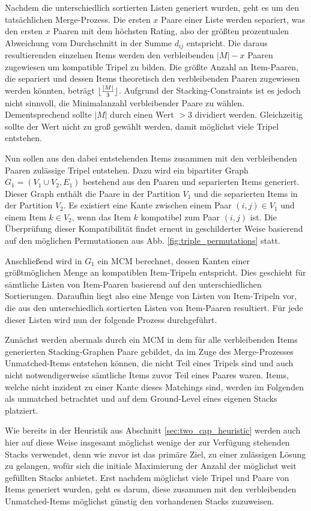 Nachdem die unterschiedlich sortierten Listen generiert wurden, geht es um den tatsächlichen Merge-Prozess.
Die ersten $x$ Paare einer Liste werden separiert, was den ersten $x$ Paaren mit dem höchsten Rating, also der größten
prozentualen Abweichung vom Durchschnitt in der Summe $d_{ij}$ entspricht. Die daraus resultierenden einzelnen Items werden den verbleibenden
$|M| - x$ Paaren zugewiesen um kompatible Tripel zu bilden. Die größte Anzahl an Item-Paaren, die separiert und dessen Items theoretisch den verbleibenden Paaren zugewiesen werden könnten, beträgt $\lfloor\frac{|M|}{3}\rfloor$. Aufgrund der Stacking-Constraints ist es jedoch nicht sinnvoll, die Minimalanzahl verbleibender Paare zu wählen. Dementsprechend sollte $|M|$ durch einen Wert $> 3$ dividiert werden. Gleichzeitig sollte der Wert nicht zu groß gewählt werden, damit möglichst viele Tripel entstehen.

Nun sollen aus den dabei entstehenden Items zusammen mit den verbleibenden Paaren zulässige Tripel entstehen.
Dazu wird ein bipartiter Graph $G_1 = (V_1 \cup V_2, E_1)$ bestehend aus den Paaren und separierten Items generiert.
Dieser Graph enthält die Paare in der Partition $V_1$ und die separierten Items in der Partition $V_2$.
Es existiert eine Kante zwischen einem Paar $(i, j) \in V_1$ und einem Item $k \in V_2$, wenn das Item $k$ kompatibel zum Paar
$(i, j)$ ist. Die Überprüfung dieser Kompatibilität findet erneut in geschilderter Weise basierend auf den möglichen Permutationen
aus Abb. \ref{fig:triple_permutations} statt.

Anschließend wird in $G_1$ ein \textsc{MCM} berechnet, dessen Kanten einer größtmöglichen Menge an kompatiblen Item-Tripeln entspricht.
Dies geschieht für sämtliche Listen von Item-Paaren basierend auf den unterschiedlichen Sortierungen.
Daraufhin liegt also eine Menge von Listen von Item-Tripeln vor, die aus den unterschiedlich sortierten Listen von Item-Paaren resultiert.
Für jede dieser Listen wird nun der folgende Prozess durchgeführt.

Zunächst werden abermals durch ein \textsc{MCM} in dem für alle verbleibenden Items generierten Stacking-Graphen
Paare gebildet, da im Zuge des Merge-Prozesses Unmatched-Items entstehen können, die nicht Teil eines Tripels sind und auch nicht notwendigerweise
sämtliche Items zuvor Teil eines Paares waren. Items, welche nicht inzident zu einer Kante dieses Matchings sind, werden im Folgenden als unmatched betrachtet und auf dem Ground-Level eines eigenen Stacks platziert.

Wie bereits in der Heuristik aus Abschnitt \ref{sec:two_cap_heuristic} werden auch hier auf diese Weise insgesamt möglichst wenige der zur Verfügung stehenden Stacks verwendet, denn wie zuvor ist das primäre Ziel, zu einer zulässigen Lösung zu gelangen, wofür sich die initiale Maximierung der Anzahl der möglichst weit gefüllten Stacks anbietet. Erst nachdem möglichst viele Tripel und Paare von Items generiert wurden, geht es darum, diese zusammen mit den verbleibenden Unmatched-Items möglichst günstig den vorhandenen Stacks zuzuweisen.

